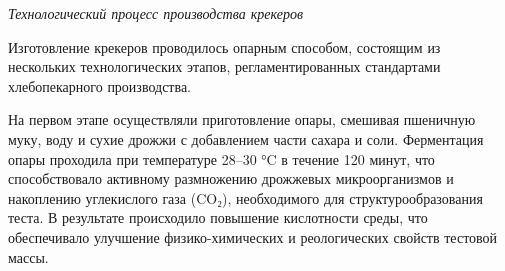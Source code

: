 {{{%

\emph{Технологический процесс производства крекеров}

Изготовление крекеров проводилось опарным способом, состоящим из
нескольких технологических этапов, регламентированных стандартами
хлебопекарного производства.

На первом этапе осуществляли приготовление опары, смешивая пшеничную
муку, воду и сухие дрожжи с добавлением части сахара и соли. Ферментация
опары проходила при температуре 28--30 °C в течение 120 минут, что
способствовало активному размножению дрожжевых микроорганизмов и
накоплению углекислого газа (CO₂), необходимого для структурообразования
теста. В результате происходило повышение кислотности среды, что
обеспечивало улучшение физико-химических и реологических свойств
тестовой массы.

}}}
